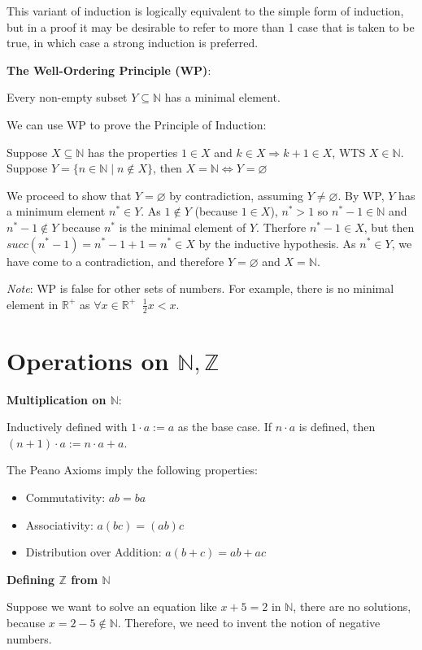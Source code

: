 \documentclass{article}
\begin{document}
\begin{multicols*}{2}
This variant of induction is logically equivalent to the simple form of induction, but in a proof it may be desirable to refer to more than 1 case that is taken to be true, in which case a strong induction is preferred.

\textbf{The Well-Ordering Principle (WP)}:

Every non-empty subset $Y \subseteq \mathbb{N}$ has a minimal element.

We can use WP to prove the Principle of Induction:

Suppose $X \subseteq \mathbb{N}$ has the properties $1 \in X$ and $k \in X \Rightarrow k+1 \in X$, WTS $X \in \mathbb{N}$. Suppose $Y = \{ n \in \mathbb{N} \;|\; n \notin X\}$, then $X = \mathbb{N} \Leftrightarrow Y = \varnothing$

We proceed to show that $Y = \varnothing$ by contradiction, assuming $Y \neq \varnothing$. By WP, $Y$ has a minimum element $n^{*} \in Y$. As $1 \notin Y$ (because $1 \in X$), $n^* > 1$ so $n^* - 1 \in \mathbb{N}$ and $n^* - 1 \notin Y$ because $n^*$ is the minimal element of $Y$. Therfore $n^* - 1 \in X$, but then $succ(n^* - 1) = n^* - 1 + 1 = n^* \in X$ by the inductive hypothesis. As $n^* \in Y$, we have come to a contradiction, and therefore $Y = \varnothing$ and $X = \mathbb{N}$.

\textit{Note}: WP is false for other sets of numbers. For example, there is no minimal element in $\mathbb{R}^{+}$ as $\forall x \in \mathbb{R}^{+}\;\; \frac{1}{2}x < x$.

\section{Operations on $\mathbb{N, Z}$}

\textbf{Multiplication on $\mathbb{N}$}:

Inductively defined with $1 \cdot a := a$ as the base case. If $n \cdot a$ is defined, then $(n+1) \cdot a := n \cdot a + a$.

The Peano Axioms imply the following properties:
\begin{itemize}
    \item Commutativity: $ab = ba$
    \item Associativity: $a(bc) = (ab)c$
    \item Distribution over Addition: $a(b+c) = ab + ac$
\end{itemize}

\textbf{Defining $\mathbb{Z}$ from $\mathbb{N}$}

Suppose we want to solve an equation like $x+5 = 2$ in $\mathbb{N}$, there are no solutions, because $x = 2 -5 \notin \mathbb{N}$. Therefore, we need to invent the notion of negative numbers. 


\end{multicols*}
\end{document}
